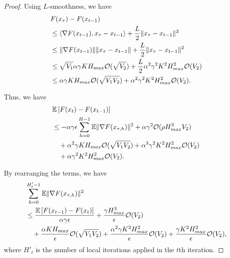 \documentclass{opt2020} %
\begin{document}
\begin{proof}

Using $L$-smoothness, we have
\begin{align*}
&F(x_\tau) - F(x_{t-1}) \\
&\leq \left\langle \nabla F(x_{t-1}), x_\tau - x_{t-1} \right \rangle + \frac{L}{2} \|x_\tau - x_{t-1}\|^2 \\
&\leq \|\nabla F(x_{t-1})\| \|x_\tau - x_{t-1}\| + \frac{L}{2} \|x_\tau - x_{t-1}\|^2 \\
&\leq \sqrt{V_1} \alpha\gamma K H_{max} {\mathcal O}(\sqrt{V_2}) + \frac{L}{2}  \alpha^2\gamma^2 K^2 H_{max}^2 {\mathcal O}(V_2) \\
&\leq  \alpha\gamma K H_{max} {\mathcal O}(\sqrt{V_1 V_2})   + \alpha^2\gamma^2 K^2 H_{max}^2 {\mathcal O}(V_2).
\end{align*}

Thus, we have
\begin{align*}
&{\mathbb{E}}\left[ F(x_t) - F(x_{t-1}) \right] \\
&\leq - \alpha \gamma \epsilon \sum_{h = 0}^{H-1} {\mathbb{E}} \|\nabla F(x_{\tau, h})\|^2  + \alpha \gamma^2 {\mathcal O}(\rho H_{max}^3 V_2) \\
&\quad + \alpha^2\gamma K H_{max} {\mathcal O}(\sqrt{V_1 V_2}) + \alpha^3\gamma^2 K^2 H_{max}^2 {\mathcal O}(V_2)\\
&\quad + \alpha \gamma^2 K^2 H_{max}^2 {\mathcal O}(V_2).
\end{align*}

By rearranging the terms, we have
\begin{align*}
&\sum_{h = 0}^{H'_{t}-1} {\mathbb{E}} \|\nabla F(x_{\tau, h})\|^2 \\
&\leq \frac{{\mathbb{E}}\left[ F(x_{t-1}) - F(x_t) \right]}{\alpha \gamma \epsilon} + \frac{\gamma H_{max}^3}{\epsilon} {\mathcal O}(V_2) \\
&\quad + \frac{\alpha K H_{max}}{\epsilon} {\mathcal O}(\sqrt{V_1 V_2})  + \frac{\alpha^2\gamma K^2 H_{max}^2}{\epsilon} {\mathcal O}(V_2)
 +  \frac{\gamma K^2 H_{max}^2}{\epsilon} {\mathcal O}(V_2),
\end{align*}
where $H'_{t}$ is the number of local iterations applied in the $t$th iteration.


\end{proof}
\end{document}
